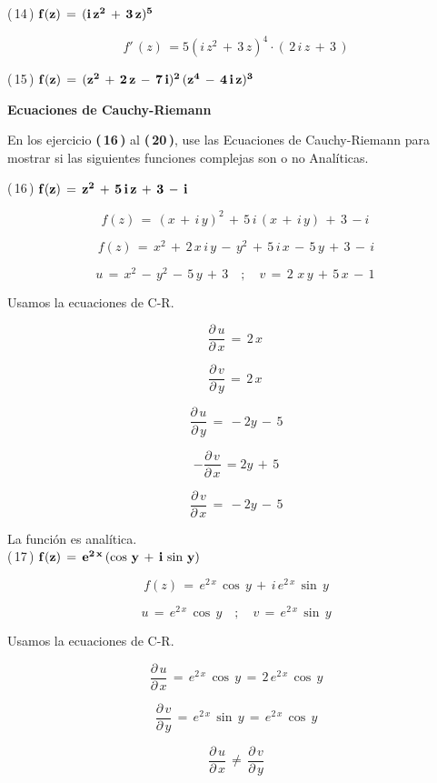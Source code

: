 \documentclass[a4paper,11pt,openany]{book}
\begin{document}
\textcolor{ao(english)}{(\,14\,)} $\bf{f(z)\,=\,(i\,z^{2}\,+\,3\,z)^{5}}$

$$ \boxed{f'\,(z)\,= 5(i\,z^{2}\,+\,3\,z)^{4} \cdot (\,2\,i\,z\,+\,3\,)} $$

\textcolor{ao(english)}{(\,15\,)} $\bf{f(z)\,=\,(z^{2}\,+\,2\,z\,-\,7\,i)^{2}\,(z^{4}\,-\,4\,i\,z)^{3}}$

\begin{center}
\textbf{Ecuaciones de Cauchy-Riemann}
\end{center}

En los ejercicio \textbf{(\,16\,)} al \textbf{(\,20\,)}, use las Ecuaciones de Cauchy-Riemann para mostrar si las siguientes funciones complejas son o no Analíticas.

\textcolor{ao(english)}{(\,16\,)} $\bf{f(z)\,=\,z^{2}\,+\,5\,i\,z\,+\,3\,-\,i}$

$$f(z)\,=\,(x\,+\,i\,y)^{2}\,+\,5\,i\,(x\,+\,i\,y)\,+\,3\,-i\,$$  

$$f(z)\,= \,x^{2}\,+\,2\,x\,i\,y\,-\,y^{2}\,+\,5\,i\,x\,-\,5\,y\,+\,3\,-\,i$$

$$u\,=\,x^{2}\,-\,y^{2}\,-\,5\,y\,+\,3 \quad;\quad v\,=\,2\,\,x\,y\,+\,5\,x\,-\,1\,$$

\textcolor{ao(english)}{} Usamos la ecuaciones de C-R.

$$\dfrac{\partial\,u}{\partial\,x}\,=\,2\,x\,$$

$$\dfrac{\partial\,v}{\partial\,y}\,=\,2\,x\,$$

$$\dfrac{\partial\,u}{\partial\,y}\,=\,-2y\,-\,5$$

$$-\dfrac{\partial\,v}{\partial\,x}\,=2y\,+\,5$$

$$\dfrac{\partial\,v}{\partial\,x}\,=\,-2y\,-\,5$$

La función es analítica.\\

\textcolor{ao(english)}{(\,17\,)} $\bf{f(z)\,=\,e^{2\,x}\,(\cos\,y\,+\,i\,\sin\,y)}$

$$f(z)\,=\,e^{2\,x}\,\cos\,y\,+\,i\,e^{2\,x}\,\sin\,y$$

$$u\,=\,e^{2\,x}\,\cos\,y \quad;\quad v\,=\,e^{2\,x}\,\sin\,y$$

\textcolor{ao(english)}{} Usamos la ecuaciones de C-R.

$$\dfrac{\partial\,u}{\partial\,x}\,=\,e^{2\,x}\,\cos\,y\,=\,2\,e^{2\,x}\,\cos\,y$$

$$\dfrac{\partial\,v}{\partial\,y}\,=\,e^{2\,x}\,\sin\,y\,=\,e^{2\,x}\,\cos\,y$$

$$\dfrac{\partial\,u}{\partial\,x}\,\neq\,\dfrac{\partial\,v}{\partial\,y}$$
\end{document}
